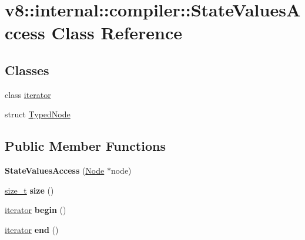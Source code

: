 \hypertarget{classv8_1_1internal_1_1compiler_1_1StateValuesAccess}{}\section{v8\+:\+:internal\+:\+:compiler\+:\+:State\+Values\+Access Class Reference}
\label{classv8_1_1internal_1_1compiler_1_1StateValuesAccess}
\subsection*{Classes}
\begin{DoxyCompactItemize}
\item 
class \mbox{\hyperlink{classv8_1_1internal_1_1compiler_1_1StateValuesAccess_1_1iterator}{iterator}}
\item 
struct \mbox{\hyperlink{structv8_1_1internal_1_1compiler_1_1StateValuesAccess_1_1TypedNode}{Typed\+Node}}
\end{DoxyCompactItemize}
\subsection*{Public Member Functions}
\begin{DoxyCompactItemize}
\item 
\mbox{\label{classv8_1_1internal_1_1compiler_1_1StateValuesAccess_ac9211a9bf437f0036f0ffcd6797f0022}} 
{\bfseries State\+Values\+Access} (\mbox{\hyperlink{classv8_1_1internal_1_1compiler_1_1Node}{Node}} $\ast$node)
\item 
\mbox{\label{classv8_1_1internal_1_1compiler_1_1StateValuesAccess_a9937af0d37330637cfb4db7e96b511a0}} 
\mbox{\hyperlink{classsize__t}{size\+\_\+t}} {\bfseries size} ()
\item 
\mbox{\label{classv8_1_1internal_1_1compiler_1_1StateValuesAccess_adf076c418f6388c34fb3b459a9e30de5}} 
\mbox{\hyperlink{classv8_1_1internal_1_1compiler_1_1StateValuesAccess_1_1iterator}{iterator}} {\bfseries begin} ()
\item 
\mbox{\label{classv8_1_1internal_1_1compiler_1_1StateValuesAccess_a3813a379f5e0c2bddc8a3501772c379e}} 
\mbox{\hyperlink{classv8_1_1internal_1_1compiler_1_1StateValuesAccess_1_1iterator}{iterator}} {\bfseries end} ()
\end{DoxyCompactItemize}


